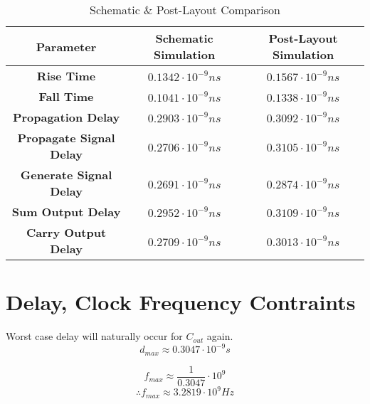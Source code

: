 \documentclass[conference]{IEEEtran}
\begin{document}
\begin{table}[H]
    \centering
    \begin{tabular}{|c|c|c|}
    \hline
    \textbf{Parameter}             & \textbf{Schematic Simulation} & \textbf{Post-Layout Simulation} \\ \hline
    \textbf{Rise Time}             & $0.1342\cdot10^{-9}ns$       & $0.1567\cdot10^{-9}ns$        \\ \hline
    \textbf{Fall Time}             & $0.1041\cdot10^{-9}ns$       & $0.1338\cdot10^{-9}ns$        \\ \hline
    \textbf{Propagation Delay}     & $0.2903\cdot10^{-9}ns$       & $0.3092\cdot10^{-9}ns$         \\ \hline
    \textbf{Propagate Signal Delay}& $0.2706\cdot10^{-9}ns$       & $0.3105\cdot10^{-9}ns$         \\ \hline
    \textbf{Generate Signal Delay} & $0.2691\cdot10^{-9}ns$       & $0.2874\cdot10^{-9}ns$         \\ \hline
    \textbf{Sum Output Delay}      & $0.2952\cdot10^{-9}ns$       & $0.3109\cdot10^{-9}ns$         \\ \hline
    \textbf{Carry Output Delay}    & $0.2709\cdot10^{-9}ns$       & $0.3013\cdot10^{-9}ns$          \\ \hline
    \end{tabular}
    \caption{Schematic \& Post-Layout Comparison}
    \label{tab:schematic_vs_postlayout, approximate}
\end{table}

    

    
\section{Delay, Clock Frequency Contraints}
Worst case delay will naturally occur for \( C_{out}\) again.
\[
d_{max} \approx 0.3047\cdot10^{-9}s
\]

\[
f_{max} \approx \frac{1}{0.3047} \cdot 10^{9}
\]
\[
\therefore f_{max} \approx 3.2819\cdot 10^{9} Hz
\]
\end{document}
